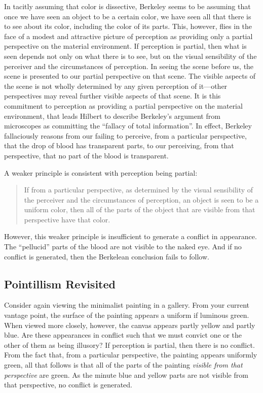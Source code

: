 \documentclass[12pt]{article}
\begin{document}
In tacitly assuming that color is dissective, Berkeley seems to be assuming that once we have seen an object to be a certain color, we have seen all that there is to see about its color, including the color of its parts. This, however, flies in the face of a modest and attractive picture of perception as providing only a partial perspective on the material environment. If perception is partial, then what is seen depends not only on what there is to see, but on the visual sensibility of the perceiver and the circumstances of perception. In seeing the scene before us, the scene is presented to our partial perspective on that scene. The visible aspects of the scene is not wholly determined by any given perception of it---other perspectives may reveal further visible aspects of that scene. It is this commitment to perception as providing a partial perspective on the material environment, that leads Hilbert to describe Berkeley's argument from microscopes as committing the ``fallacy of total information''. In effect, Berkeley fallaciously reasons from our failing to perceive, from a particular perspective, that the drop of blood has transparent parts, to our perceiving, from that perspective, that no part of the blood is transparent.

A weaker principle is consistent with perception being partial:
\begin{quote}
	If from a particular perspective, as determined by the visual sensibility of the perceiver and the circumstances of perception, an object is seen to be a uniform color, then all of the parts of the object that are visible from that perspective have that color.
\end{quote}
However, this weaker principle is insufficient to generate a conflict in appearance. The ``pellucid'' parts of the blood are not visible to the naked eye. And if no conflict is generated, then the Berkelean conclusion fails to follow.


\subsection{Pointillism Revisited}\label{sub:pointillism_revisited} %

Consider again viewing the minimalist painting in a gallery. From your current vantage point, the surface of the painting appears a uniform if luminous green. When viewed more closely, however, the canvas appears partly yellow and partly blue. Are these appearances in conflict such that we must convict one or the other of them as being illusory? If perception is partial, then there is no conflict. From the fact that, from a particular perspective, the painting appears uniformly green, all that follows is that all of the parts of the painting \emph{visible from that perspective} are green. As the minute blue and yellow parts are not visible from that perspective, no conflict is generated.
\end{document}
